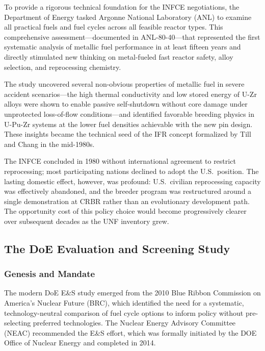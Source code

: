 \documentclass[10pt,twoside]{article}
\begin{document}
To provide a rigorous technical foundation for the INFCE negotiations, the
Department of Energy tasked Argonne National Laboratory (ANL) to examine
all practical fuels and fuel cycles across all feasible reactor types.  This
comprehensive assessment---documented in ANL-80-40\cite{ANL8040}---that
represented
the first systematic analysis of metallic fuel performance in at least fifteen
years and directly stimulated new thinking on metal-fueled fast reactor safety,
alloy selection, and reprocessing chemistry.

The study uncovered several non-obvious properties of metallic fuel in severe
accident scenarios---the high thermal conductivity and low stored energy of
U-Zr alloys were shown to enable passive self-shutdown without core damage
under unprotected loss-of-flow conditions---and identified favorable breeding
physics in U-Pu-Zr systems at the lower fuel densities achievable with the
new pin design.  These insights became the technical seed of the IFR concept
formalized by Till and Chang in the mid-1980s.\cite{Till2011}

The INFCE concluded in 1980 without international agreement to restrict
reprocessing; most participating nations declined to adopt the U.S.\ position.
The lasting domestic effect, however, was profound: U.S.\ civilian reprocessing
capacity was effectively abandoned, and the breeder program was restructured
around a single demonstration at CRBR rather than an evolutionary development
path.  The opportunity cost of this policy choice would become progressively
clearer over subsequent decades as the UNF inventory grew.

\subsection{The DoE Evaluation and Screening Study}

\subsubsection{Genesis and Mandate}

The modern DoE E\&S study emerged from the 2010 Blue Ribbon Commission on
America's Nuclear Future (BRC),\cite{BRC2012} which identified the need for a
systematic, technology-neutral comparison of fuel cycle options to inform policy
without pre-selecting preferred technologies.  The Nuclear Energy Advisory
Committee (NEAC) recommended the E\&S effort, which was formally initiated
by the DOE Office of Nuclear Energy and completed in 2014.
\end{document}
